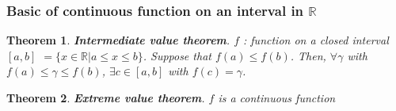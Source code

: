 \documentclass[a4paper,10pt]{article}
\newtheorem{theo}{Theorem}
\newcommand{\R}{\mathbb{R}}
\begin{document}
\subsubsection{Basic of continuous function on an interval in $ \R $}

\begin{theo}
	\textbf{Intermediate value theorem}. $ f $ : function on a closed interval $ [a,b] $ $ = \{ x \in \R | a \leq x \leq b \} $. Suppose that $ f(a) \leq f(b) $. Then, $ \forall \gamma $ with $ f(a) \leq \gamma \leq f(b) $, $ \exists c \in [a,b] $ with $ f(c)=\gamma $.
\end{theo}

\begin{theo}
	\textbf{Extreme value theorem}. $ f $ is a continuous function
\end{theo}
\end{document}
